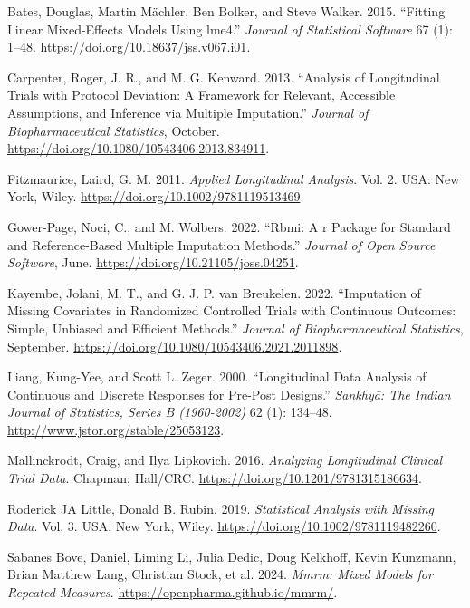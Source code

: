 \documentclass[
  letterpaper,
  DIV=11,
  numbers=noendperiod]{scrreprt}
\newlength{\cslhangindent}
\newlength{\cslentryspacingunit} %
\newenvironment{CSLReferences}[2] %
 {%
  \setlength{\parindent}{0pt}
  \ifodd #1
  \let\oldpar\par
  \def\par{\hangindent=\cslhangindent\oldpar}
  \fi
  \setlength{\parskip}{#2\cslentryspacingunit}
 }%
 {}
\begin{document}
\hypertarget{refs}{}
\begin{CSLReferences}{1}{0}
\leavevmode{}%
Bates, Douglas, Martin Mächler, Ben Bolker, and Steve Walker. 2015.
{``Fitting Linear Mixed-Effects Models Using {lme4}.''} \emph{Journal of
Statistical Software} 67 (1): 1--48.
\url{https://doi.org/10.18637/jss.v067.i01}.

\leavevmode{}%
Carpenter, Roger, J. R., and M. G. Kenward. 2013. {``Analysis of
Longitudinal Trials with Protocol Deviation: A Framework for Relevant,
Accessible Assumptions, and Inference via Multiple Imputation.''}
\emph{Journal of Biopharmaceutical Statistics}, October.
\url{https://doi.org/10.1080/10543406.2013.834911}.

\leavevmode{}%
Fitzmaurice, Laird, G. M. 2011. \emph{Applied Longitudinal Analysis}.
Vol. 2. USA: New York, Wiley.
\url{https://doi.org/10.1002/9781119513469}.

\leavevmode{}%
Gower-Page, Noci, C., and M. Wolbers. 2022. {``Rbmi: A r Package for
Standard and Reference-Based Multiple Imputation Methods.''}
\emph{Journal of Open Source Software}, June.
\url{https://doi.org/10.21105/joss.04251}.

\leavevmode{}%
Kayembe, Jolani, M. T., and G. J. P. van Breukelen. 2022. {``Imputation
of Missing Covariates in Randomized Controlled Trials with Continuous
Outcomes: Simple, Unbiased and Efficient Methods.''} \emph{Journal of
Biopharmaceutical Statistics}, September.
\url{https://doi.org/10.1080/10543406.2021.2011898}.

\leavevmode{}%
Liang, Kung-Yee, and Scott L. Zeger. 2000. {``Longitudinal Data Analysis
of Continuous and Discrete Responses for Pre-Post Designs.''}
\emph{Sankhyā: The Indian Journal of Statistics, Series B (1960-2002)}
62 (1): 134--48. \url{http://www.jstor.org/stable/25053123}.

\leavevmode{}%
Mallinckrodt, Craig, and Ilya Lipkovich. 2016. \emph{Analyzing
Longitudinal Clinical Trial Data}. Chapman; Hall/CRC.
\url{https://doi.org/10.1201/9781315186634}.

\leavevmode{}%
Roderick JA Little, Donald B. Rubin. 2019. \emph{Statistical Analysis
with Missing Data}. Vol. 3. USA: New York, Wiley.
\url{https://doi.org/10.1002/9781119482260}.

\leavevmode{}%
Sabanes Bove, Daniel, Liming Li, Julia Dedic, Doug Kelkhoff, Kevin
Kunzmann, Brian Matthew Lang, Christian Stock, et al. 2024. \emph{Mmrm:
Mixed Models for Repeated Measures}.
\url{https://openpharma.github.io/mmrm/}.

\end{CSLReferences}
\end{document}
